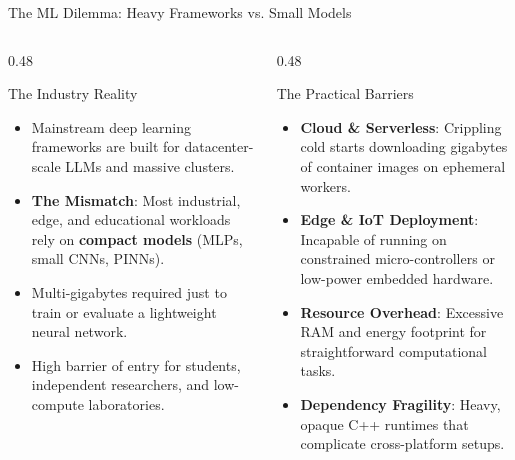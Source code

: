 \documentclass[11pt,aspectratio=169]{beamer}
\begin{document}
\begin{frame}{The ML Dilemma: Heavy Frameworks vs. Small Models}
  \begin{columns}[T,onlytextwidth]
    \begin{column}{0.48\textwidth}
      \begin{block}{The Industry Reality}
        \begin{itemize}
          \setlength{\itemsep}{0.35em}
          \item Mainstream deep learning frameworks are built for datacenter-scale LLMs and massive clusters.
          \item \textbf{The Mismatch}: Most industrial, edge, and educational workloads rely on \textbf{compact models} (MLPs, small CNNs, PINNs).
          \item Multi-gigabytes required just to train or evaluate a lightweight neural network.
          \item High barrier of entry for students, independent researchers, and low-compute laboratories.
        \end{itemize}
      \end{block}
    \end{column}

    \begin{column}{0.48\textwidth}
      \begin{alertblock}{The Practical Barriers}
        \begin{itemize}
          \setlength{\itemsep}{0.35em}
          \item \textbf{Cloud \& Serverless}: Crippling cold starts downloading gigabytes of container images on ephemeral workers.
          \item \textbf{Edge \& IoT Deployment}: Incapable of running on constrained micro-controllers or low-power embedded hardware.
          \item \textbf{Resource Overhead}: Excessive RAM and energy footprint for straightforward computational tasks.
          \item \textbf{Dependency Fragility}: Heavy, opaque C++ runtimes that complicate cross-platform setups.
        \end{itemize}
      \end{alertblock}
    \end{column}
  \end{columns}
\end{frame}
\end{document}
